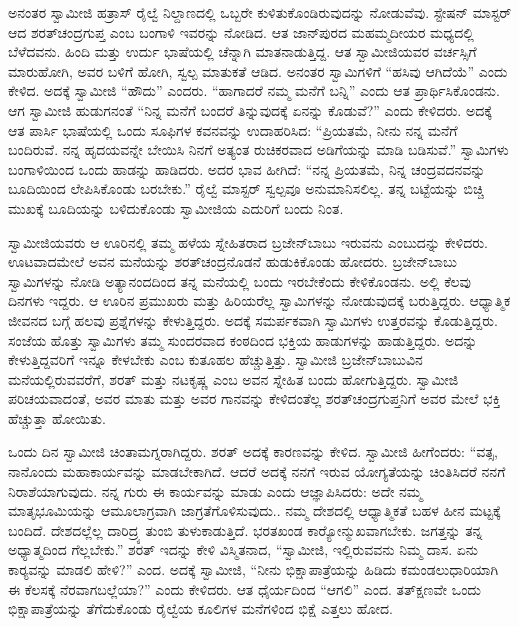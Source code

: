  ಅನಂತರ ಸ್ವಾಮೀಜಿ ಹತ್ರಾಸ್ ರೈಲ್ವೆ ನಿಲ್ದಾಣದಲ್ಲಿ ಒಬ್ಬರೇ ಕುಳಿತುಕೊಂಡಿರುವುದನ್ನು ನೋಡುವೆವು. ಸ್ಟೇಷನ್ ಮಾಸ್ಟರ್ ಆದ ಶರತ್‍ಚಂದ್ರಗುಪ್ತ ಎಂಬ ಬಂಗಾಳಿ ಇವರನ್ನು ನೋಡಿದ. ಆತ ಜಾನ್‍ಪುರದ ಮಹಮ್ಮದೀಯರ ಮಧ್ಯದಲ್ಲಿ ಬೆಳೆದವನು. ಹಿಂದಿ ಮತ್ತು ಉರ್ದು ಭಾಷೆಯಲ್ಲಿ ಚೆನ್ನಾಗಿ ಮಾತನಾಡುತ್ತಿದ್ದ. ಆತ ಸ್ವಾಮೀಜಿಯವರ ವರ್ಚಸ್ಸಿಗೆ ಮಾರುಹೋಗಿ, ಅವರ ಬಳಿಗೆ ಹೋಗಿ, ಸ್ವಲ್ಪ ಮಾತುಕತೆ ಆಡಿದ. ಅನಂತರ ಸ್ವಾಮಿಗಳಿಗೆ “ಹಸಿವು ಆಗಿದೆಯೆ” ಎಂದು ಕೇಳಿದ. ಅದಕ್ಕೆ ಸ್ವಾಮೀಜಿ “ಹೌದು” ಎಂದರು. “ಹಾಗಾದರೆ ನಮ್ಮ ಮನೆಗೆ ಬನ್ನಿ” ಎಂದು ಆತ ಪ್ರಾರ್ಥಿಸಿಕೊಂಡನು. ಆಗ ಸ್ವಾಮೀಜಿ ಹುಡುಗನಂತೆ “ನಿನ್ನ ಮನೆಗೆ ಬಂದರೆ ತಿನ್ನುವುದಕ್ಕೆ ಏನನ್ನು ಕೊಡುವೆ?” ಎಂದು ಕೇಳಿದರು. ಅದಕ್ಕೆ ಆತ ಪಾರ್ಸಿ ಭಾಷೆಯಲ್ಲಿ ಒಂದು ಸೂಫಿಗಳ ಕವನವನ್ನು ಉದಾಹರಿಸಿದ: “ಪ್ರಿಯತಮೆ, ನೀನು ನನ್ನ ಮನೆಗೆ ಬಂದಿರುವೆ. ನನ್ನ ಹೃದಯವನ್ನೇ ಬೇಯಿಸಿ ನಿನಗೆ ಅತ್ಯಂತ ರುಚಿಕರವಾದ ಅಡಿಗೆಯನ್ನು ಮಾಡಿ ಬಡಿಸುವೆ.” ಸ್ವಾಮಿಗಳು ಬಂಗಾಳಿಯಿಂದ ಒಂದು ಹಾಡನ್ನು ಹಾಡಿದರು. ಅದರ ಭಾವ ಹೀಗಿದೆ: “ನನ್ನ ಪ್ರಿಯತಮೆ, ನಿನ್ನ ಚಂದ್ರವದನವನ್ನು ಬೂದಿಯಿಂದ ಲೇಪಿಸಿಕೊಂಡು ಬರಬೇಕು.” ರೈಲ್ವೆ ಮಾಸ್ಟರ್ ಸ್ವಲ್ಪವೂ ಅನುಮಾನಿಸಲಿಲ್ಲ. ತನ್ನ ಬಟ್ಟೆಯನ್ನು ಬಿಚ್ಚಿ ಮುಖಕ್ಕೆ ಬೂದಿಯನ್ನು ಬಳಿದುಕೊಂಡು ಸ್ವಾಮೀಜಿಯ ಎದುರಿಗೆ ಬಂದು ನಿಂತ. 

 ಸ್ವಾಮೀಜಿಯವರು ಆ ಊರಿನಲ್ಲಿ ತಮ್ಮ ಹಳೆಯ ಸ್ನೇಹಿತರಾದ ಬ್ರಜೇನ್‍ಬಾಬು ಇರುವನು ಎಂಬುದನ್ನು ಕೇಳಿದರು. ಊಟವಾದಮೇಲೆ ಅವನ ಮನೆಯನ್ನು ಶರತ್‍ಚಂದ್ರನೊಡನೆ ಹುಡುಕಿಕೊಂಡು ಹೋದರು. ಬ್ರಜೇನ್‍ಬಾಬು ಸ್ವಾಮಿಗಳನ್ನು ನೋಡಿ ಅತ್ಯಾನಂದದಿಂದ ತನ್ನ ಮನೆಯಲ್ಲಿ ಬಂದು ಇರಬೇಕೆಂದು ಕೇಳಿಕೊಂಡನು. ಅಲ್ಲಿ ಕೆಲವು ದಿನಗಳು ಇದ್ದರು. ಆ ಊರಿನ ಪ್ರಮುಖರು ಮತ್ತು ಹಿರಿಯರೆಲ್ಲ ಸ್ವಾಮಿಗಳನ್ನು ನೋಡುವುದಕ್ಕೆ ಬರುತ್ತಿದ್ದರು. ಆಧ್ಯಾತ್ಮಿಕ ಜೀವನದ ಬಗ್ಗೆ ಹಲವು ಪ್ರಶ್ನೆಗಳನ್ನು ಕೇಳುತ್ತಿದ್ದರು. ಅದಕ್ಕೆ ಸಮರ್ಪಕವಾಗಿ ಸ್ವಾಮಿಗಳು ಉತ್ತರವನ್ನು ಕೊಡುತ್ತಿದ್ದರು. ಸಂಜೆಯ ಹೊತ್ತು ಸ್ವಾಮಿಗಳು ತಮ್ಮ ಸುಂದರವಾದ ಕಂಠದಿಂದ ಭಕ್ತಿಯ ಹಾಡುಗಳನ್ನು ಹಾಡುತ್ತಿದ್ದರು. ಅದನ್ನು ಕೇಳುತ್ತಿದ್ದವರಿಗೆ ಇನ್ನೂ ಕೇಳಬೇಕು ಎಂಬ ಕುತೂಹಲ ಹೆಚ್ಚುತ್ತಿತ್ತು. ಸ್ವಾಮೀಜಿ ಬ್ರಜೇನ್‍ಬಾಬುವಿನ ಮನೆಯಲ್ಲಿರುವವರೆಗೆ, ಶರತ್ ಮತ್ತು ನಟಕೃಷ್ಣ ಎಂಬ ಅವನ ಸ್ನೇಹಿತ ಬಂದು ಹೋಗುತ್ತಿದ್ದರು. ಸ್ವಾಮೀಜಿ ಪರಿಚಯವಾದಂತೆ, ಅವರ ಮಾತು ಮತ್ತು ಅವರ ಗಾನವನ್ನು ಕೇಳಿದಂತೆಲ್ಲ ಶರತ್‍ಚಂದ್ರಗುಪ್ತನಿಗೆ ಅವರ ಮೇಲೆ ಭಕ್ತಿ ಹೆಚ್ಚುತ್ತಾ ಹೋಯಿತು. 

 ಒಂದು ದಿನ ಸ್ವಾಮೀಜಿ ಚಿಂತಾಮಗ್ನರಾಗಿದ್ದರು. ಶರತ್ ಅದಕ್ಕೆ ಕಾರಣವನ್ನು ಕೇಳಿದ. ಸ್ವಾಮೀಜಿ ಹೀಗೆಂದರು: “ವತ್ಸ, ನಾನೊಂದು ಮಹಾಕಾರ್ಯವನ್ನು ಮಾಡಬೇಕಾಗಿದೆ. ಆದರೆ ಅದಕ್ಕೆ ನನಗೆ ಇರುವ ಯೋಗ್ಯತೆಯನ್ನು ಚಿಂತಿಸಿದರೆ ನನಗೆ ನಿರಾಶೆಯಾಗುವುದು. ನನ್ನ ಗುರು ಈ ಕಾರ್ಯವನ್ನು ಮಾಡು ಎಂದು ಆಜ್ಞಾಪಿಸಿದರು: ಅದೇ ನಮ್ಮ ಮಾತೃಭೂಮಿಯನ್ನು ಆಮೂಲಾಗ್ರವಾಗಿ ಜಾಗ್ರತೆಗೊಳಿಸುವುದು.. ನಮ್ಮ ದೇಶದಲ್ಲಿ ಆಧ್ಯಾತ್ಮಿಕತೆ ಬಹಳ ಹೀನ ಮಟ್ಟಕ್ಕೆ ಬಂದಿದೆ. ದೇಶದಲ್ಲೆಲ್ಲ ದಾರಿದ್ರ್ಯ ತುಂಬಿ ತುಳುಕಾಡುತ್ತಿದೆ. ಭರತಖಂಡ ಕಾರ‍್ಯೋನ್ಮುಖವಾಗಬೇಕು. ಜಗತ್ತನ್ನು ತನ್ನ ಅಧ್ಯಾತ್ಮದಿಂದ ಗೆಲ್ಲಬೇಕು.” ಶರತ್ ಇದನ್ನು ಕೇಳಿ ವಿಸ್ಮಿತನಾದ, “ಸ್ವಾಮೀಜಿ, ಇಲ್ಲಿರುವವನು ನಿಮ್ಮ ದಾಸ. ಏನು ಕಾರ‍್ಯವನ್ನು ಮಾಡಲಿ ಹೇಳಿ?” ಎಂದ. ಅದಕ್ಕೆ ಸ್ವಾಮೀಜಿ, “ನೀನು ಭಿಕ್ಷಾಪಾತ್ರೆಯನ್ನು ಹಿಡಿದು ಕಮಂಡಲುಧಾರಿಯಾಗಿ ಈ ಕೆಲಸಕ್ಕೆ ನೆರವಾಗಬಲ್ಲೆಯಾ?” ಎಂದು ಕೇಳಿದರು. ಆತ ಧೈರ್ಯದಿಂದ “ಆಗಲಿ” ಎಂದ. ತತ್‍ಕ್ಷಣವೇ ಒಂದು ಭಿಕ್ಷಾಪಾತ್ರೆಯನ್ನು ತೆಗೆದುಕೊಂಡು ರೈಲ್ವೆಯ ಕೂಲಿಗಳ ಮನೆಗಳಿಂದ ಭಿಕ್ಷೆ ಎತ್ತಲು ಹೋದ. 

